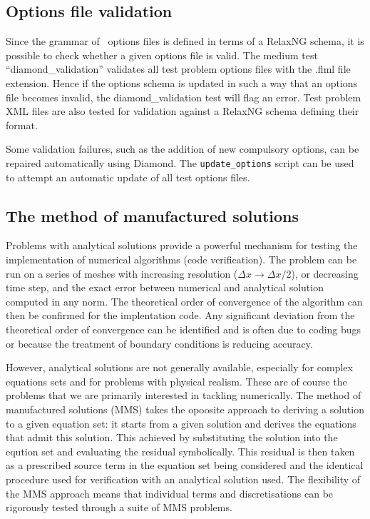 \subsection{Options file validation}

Since the grammar of \fluidity\ options files is defined in terms of a RelaxNG
schema, it is possible to check whether a given options file is valid. The
medium test ``diamond\_validation'' validates all test problem options files
with the .flml file extension. Hence if the options schema is updated in such
a way that an options file becomes invalid, the diamond\_validation test will
flag an error. Test problem XML files are also tested for validation against a
RelaxNG schema defining their format.

Some validation failures, such as the addition of new compulsory options, can
be repaired automatically using Diamond. The \lstinline[language = Bash]+update_options+
script can be used to attempt an automatic update of all test options files.

\subsection{The method of manufactured solutions}\label{sect:mms}
Problems with analytical solutions provide a powerful mechanism for testing the implementation
of numerical algorithms (code verification). The problem can be run on a series of meshes
with increasing resolution (\eg $\Delta x \rightarrow \Delta x/2$), or decreasing time step,
and the exact error between numerical and analytical solution computed in any norm. The theoretical
order of convergence of the algorithm can then be confirmed for the implentation code. Any significant
deviation from the theoretical order of convergence can be identified and is often due to coding bugs
or because the treatment of boundary conditions is reducing accuracy.

However, analytical solutions are not generally available, especially for complex equations sets
and for problems with physical realism. These are of course the problems that we are primarily 
interested in tackling numerically.
The method of manufactured solutions (MMS) takes the opoosite approach to deriving a solution to 
a given equation set: it starts from a given solution and derives the equations that admit this
solution. This achieved by substituting the solution into the eqution set and evaluating the residual
symbolically. This residual is then taken as a prescribed source term in the equation set being considered
and the identical procedure used for verification with an analytical solution used. The flexibility of the MMS
approach means that individual terms and discretisations can be rigorously tested through a suite of MMS problems. 

